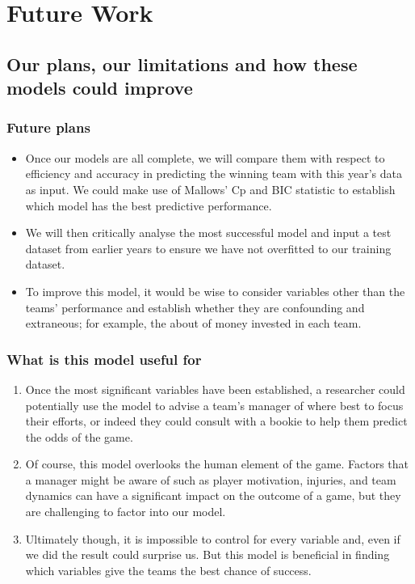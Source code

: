 \documentclass{beamer}
\begin{document}
\section{Future Work}
\subsection{Our plans, our limitations and how these models could improve}
\begin{frame}
  \frametitle{Future plans}
  \begin{itemize}
    \item Once our models are all complete, we will compare them with respect to efficiency and accuracy in predicting the winning team with this year's data as input. We could make use of Mallows' Cp and BIC statistic to establish which model has the best predictive performance.
    \item We will then critically analyse the most successful model and input a test dataset from earlier years to ensure we have not overfitted to our training dataset.
    \item To improve this model, it would be wise to consider variables other than the teams' performance and establish whether they are confounding and extraneous; for example, the about of money invested in each team.
  \end{itemize}
\end{frame}
% 
% 
% 
% 
% 
% 
% 
% 
\begin{frame}
  \frametitle{What is this model useful for}
  \begin{enumerate}
    \item Once the most significant variables have been established, a researcher could potentially use the model to advise  a team's manager of where best to focus their efforts, or indeed they could consult with a bookie to help them predict the odds of the game.
    \item Of course, this model overlooks the human element of the game. Factors that a manager might be aware of such as player motivation, injuries, and team dynamics can have a significant impact on the outcome of a game, but they are challenging to factor into our model.
    \item Ultimately though, it is impossible to control for every variable and, even if we did the result could surprise us. But this model is beneficial in finding which variables give the teams the best chance of success.
  \end{enumerate}
\end{frame}
% 
% 
% 
% 
% 
% 
% 
% 
\end{document}
